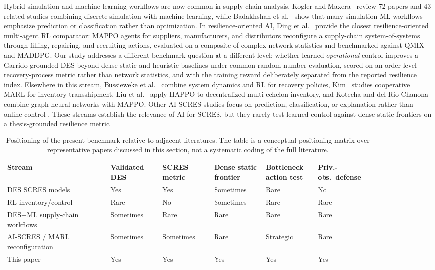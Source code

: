 Hybrid simulation and machine-learning workflows are now common in
supply-chain analysis. Kogler and Maxera~\cite{kogler2026} review 72
papers and 43 related studies combining discrete simulation with machine
learning, while Badakhshan et al.~\cite{badakhshan2024} show that many
simulation-ML workflows emphasize prediction or classification rather
than optimization. In resilience-oriented AI, Ding et al.~\cite{ding2026}
provide the closest resilience-oriented multi-agent RL comparator: MAPPO
agents for suppliers, manufacturers, and distributors reconfigure a
supply-chain system-of-systems through filling, repairing, and
recruiting actions, evaluated on a composite of complex-network
statistics and benchmarked against QMIX and MADDPG. Our study addresses
a different benchmark question at a different level: whether learned
\emph{operational} control improves a Garrido-grounded DES beyond dense
static and heuristic baselines under common-random-number evaluation,
scored on an order-level recovery-process metric rather than network
statistics, and with the training reward deliberately separated from the
reported resilience index. Elsewhere in this stream,
Bussieweke et al.~\cite{bussieweke2024recovery} combine system dynamics
and RL for recovery policies, Kim~\cite{kim2024} studies cooperative
MARL for inventory transshipment, Liu et al.~\cite{liu2025pom} apply
HAPPO to decentralized multi-echelon inventory, and Kotecha and del Rio
Chanona~\cite{kotecha2025} combine graph neural networks with MAPPO.
Other AI-SCRES studies focus on prediction, classification, or
explanation rather than online control
\cite{rajagopal2024,rezki2024,ordibazar2022}. These streams establish
the relevance of AI for SCRES, but they rarely test learned control
against dense static frontiers on a thesis-grounded resilience metric.

\begin{table}[htbp]
\centering
\caption{Positioning of the present benchmark relative to adjacent literatures. The table is a conceptual positioning matrix over representative papers discussed in this section, not a systematic coding of the full literature.}
\label{tab:literature_gap}
\footnotesize
\setlength{\tabcolsep}{3.5pt}
\begin{tabular}{p{0.24\linewidth}>{\centering\arraybackslash}p{0.125\linewidth}>{\centering\arraybackslash}p{0.125\linewidth}>{\centering\arraybackslash}p{0.125\linewidth}>{\centering\arraybackslash}p{0.125\linewidth}>{\centering\arraybackslash}p{0.125\linewidth}}
\toprule
Stream & Validated DES & SCRES metric & Dense static frontier & Bottleneck action test & Priv.-obs.\ defense \\
\midrule
DES SCRES models & Yes & Yes & Sometimes & Rare & No \\
RL inventory/control & Rare & No & Sometimes & Rare & Rare \\
DES+ML supply-chain workflows & Sometimes & Rare & Rare & Rare & Rare \\
AI-SCRES / MARL reconfiguration & Sometimes & Sometimes & Rare & Strategic & Rare \\
This paper & Yes & Yes & Yes & Yes & Yes \\
\bottomrule
\end{tabular}
\end{table}

